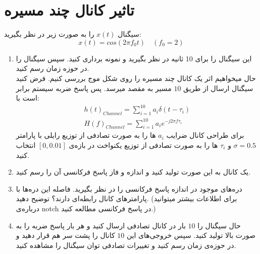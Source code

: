 \documentclass[a4paper]{article}
\begin{document}
\section{
تاثیر کانال چند مسیره
}
سیگنال $ x(t) $ را به صورت زیر در نظر بگیرید:
\begin{equation}
			 x(t) =  cos(2 \pi  f_{0} t)	\quad (f_{0}  = 2)
\end{equation}
\begin{enumerate}
	\item 
	این سیگنال را برای 10 ثانیه در نظر بگیرید و نمونه برداری کنید. سپس سیگنال را در حوزه زمان رسم کنید.
	\\
حال میخواهیم اثر یک کانال چند مسیره را روی شکل موج بررسی کنیم. فرض کنید سیگنال ارسال از طریق $ 10 $ مسیر به مقصد میرسد. پس پاسخ ضربه سیستم برابر است با: 
\begin{equation}
	\begin{split}
		h(t)_{Channel} =  \sum_{i=1}^{10} a_{i} \delta(t-\tau_{i})
		\\
		H(f)_{Channel} =  \sum_{i=1}^{10} a_{i} e^{-j2 \pi f \tau_{i}}
	\end{split}
	\label{channel}
\end{equation}
برای طراحی کانال ضرایب $ a_{i} $ ها را به صورت تصادفی از توزیع رایلی با پارامتر $ \sigma = 0.5 $ و  $ \tau_{i} $ ها را به صورت تصادفی از توزیع یکنواخت در بازه‌ی $ [0,0.01] $ انتخاب کنید.
\item
یک کانال به این صورت تولید کنید و اندازه و فاز پاسخ فرکانسی آن را رسم کنید.
\item
دره‌های موجود در اندازه پاسخ فرکانسی را در نظر بگیرید. فاصله این دره‌ها با پارامتر‌های کانال رابطه‌ای دارند؟ توضیح دهید.
(برای اطلاعات بیشتر میتوانید درباره‌ی notch در پاسخ فرکانسی مطالعه کنید.)
\item
حال سیگنال را $ 10 $ بار در کانال تصادفی ارسال کنید و هر بار پاسخ ضربه را به صورت بالا تولید کنید. سپس خروجی‌های این  $ 10 $ کانال را پشت سر هم قرار دهید و در حوزه‌ی زمان رسم کنید و تغییرات تصادفی توان سیگنال را مشاهده کنید.
\end{enumerate}
\end{document}
